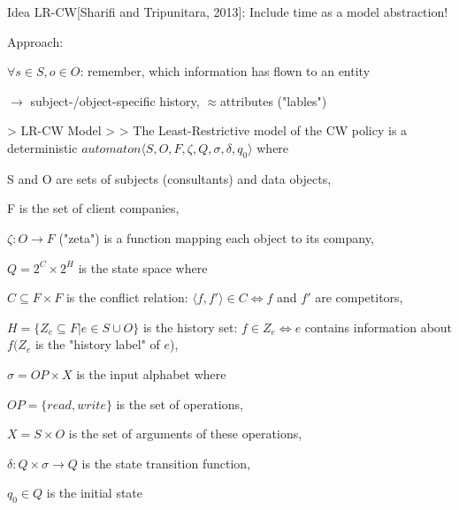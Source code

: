 \documentclass[a4paper]{article}
\begin{document}
\begin{multicols}{3}
    Idea LR-CW[Sharifi and Tripunitara, 2013]: Include time as a model abstraction!

    Approach:
    \begin{itemize*}
        \item $\forall s\in S,o\in O$: remember, which information has flown to an entity
        \item $\rightarrow$ subject-/object-specific history, $\approx$attributes ("lables")
    \end{itemize*}

    > LR-CW Model
    >
    > The Least-Restrictive model of the CW policy is a deterministic $automaton ⟨S,O,F,\zeta,Q,\sigma,\delta,q_0⟩$ where
    \begin{itemize*}
        \item S and O are sets of subjects (consultants) and data objects,
        \item F is the set of client companies,
        \item $\zeta:O\rightarrow F$ ("zeta") is a function mapping each object to its company,
        \item $Q=2^C \times 2^H$ is the state space where
              \begin{itemize*}
                  \item $C\subseteq F\times F$ is the conflict relation: $⟨f,f'⟩\in C\Leftrightarrow f$ and $f'$ are competitors,
                  \item $H=\{Z_e\subseteq F|e\in S\cup O\}$ is the history set: $f\in Z_e\Leftrightarrow e$ contains information about $f(Z_e$ is the "history label" of $e$),
              \end{itemize*}
        \item $\sigma=OP\times X$ is the input alphabet where
              \begin{itemize*}
                  \item $OP=\{read,write\}$ is the set of operations,
                  \item $X=S\times O$ is the set of arguments of these operations,
              \end{itemize*}
        \item $\delta:Q\times\sigma\rightarrow Q$ is the state transition function,
        \item $q_0\in Q$ is the initial state
    \end{itemize*}


\end{multicols}
\end{document}
